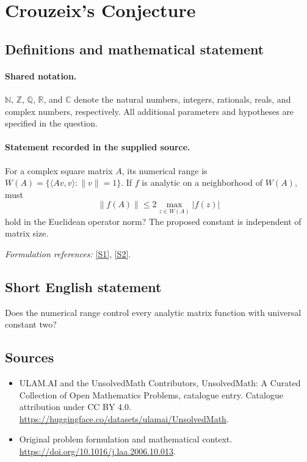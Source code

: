 \documentclass[11pt]{article}
\newcommand{\sref}[2]{\hyperlink{source:#1:#2}{[S#2]}}
\begin{document}
\section{Crouzeix's Conjecture}\label{statement}

\subsection{Definitions and mathematical statement}

\paragraph{Shared notation.}$\mathbb N$, $\mathbb Z$, $\mathbb Q$, $\mathbb R$, and $\mathbb C$ denote the natural numbers, integers, rationals, reals, and complex numbers, respectively. All additional parameters and hypotheses are specified in the question.


\paragraph{Statement recorded in the supplied source.}
For a complex square matrix $A$, its numerical range is $W(A)=\{\langle Av,v\rangle:\|v\|=1\}$. If $f$ is analytic on a neighborhood of $W(A)$, must
\[\|f(A)\|\leq2\max_{z\in W(A)}|f(z)|\]
hold in the Euclidean operator norm? The proposed constant is independent of matrix size.
\par\smallskip\textit{Formulation references:} \sref{statement}{1}, \sref{statement}{2}.
\subsection{Short English statement}
Does the numerical range control every analytic matrix function with universal constant two?
\subsection{Sources}
\begin{itemize}
\item[\hypertarget{source:statement:1}{S1}] ULAM.AI and the UnsolvedMath Contributors, UnsolvedMath: A Curated Collection of Open Mathematics Problems, catalogue entry. Catalogue attribution under CC BY 4.0.
\url{https://huggingface.co/datasets/ulamai/UnsolvedMath}.
\item[\hypertarget{source:statement:2}{S2}] Original problem formulation and mathematical context.
\url{https://doi.org/10.1016/j.laa.2006.10.013}.
\end{itemize}
\label{end:statement}
\end{document}
